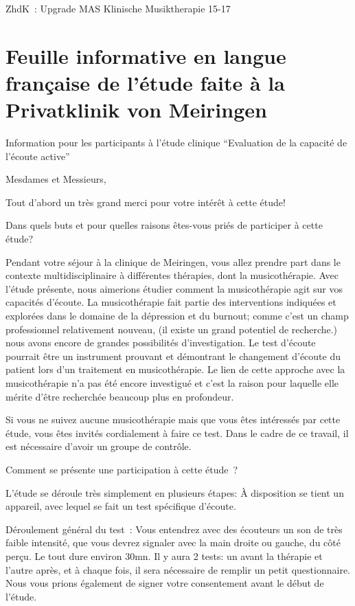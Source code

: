 \textgerman{ZhdK : Upgrade MAS Klinische Musiktherapie 15-17}

\section{Feuille informative en langue française de l'étude faite à la Privatklinik von Meiringen}

Information pour les participants à l'étude clinique
\foreignquote{french}{Evaluation de la capacité de l'écoute active}


Mesdames et Messieurs,

Tout d'abord un très grand merci pour votre intérêt à cette étude!

Dans quels buts et pour quelles raisons êtes-vous priés de participer à
cette étude?

Pendant votre séjour à la clinique de Meiringen, vous allez prendre
part dans le contexte multidisciplinaire à différentes thérapies, dont
la musicothérapie. Avec l'étude présente, nous aimerions étudier comment
la musicothérapie agit sur vos capacités d'écoute.
La musicothérapie fait partie des interventions indiquées et explorées dans le domaine
de la dépression et du burnout; comme c'est un champ
professionnel
relativement nouveau, (il existe un grand potentiel de recherche.) nous avons encore de grandes possibilités d'investigation.
Le test d'écoute pourrait être un instrument prouvant et démontrant le changement
d'écoute du patient lors d'un traitement en musicothérapie.
Le lien de cette approche avec la musicothérapie n'a pas été encore
investigué et c'est la raison pour laquelle elle mérite d'être
recherchée beaucoup plus en profondeur.

Si vous ne suivez aucune musicothérapie mais que vous êtes intéressés
par cette étude, vous êtes invités cordialement à faire ce test. Dans
le cadre de ce travail, il est nécessaire d'avoir un groupe de contrôle.

Comment se présente une participation à cette étude ?

L'étude se déroule très simplement en plusieurs étapes:
À disposition se tient un appareil, avec lequel se fait un test spécifique d'écoute.

Déroulement général du test :
Vous entendrez  avec des écouteurs un son de très faible intensité, que
vous devrez signaler avec la main droite ou gauche, du côté
perçu.
Le tout dure environ 30mn.
Il y aura 2 tests: un avant la thérapie et l'autre après, et à chaque
fois, il sera nécessaire de remplir un petit questionnaire.
Nous vous prions également de signer votre consentement avant le début
de l'étude.


